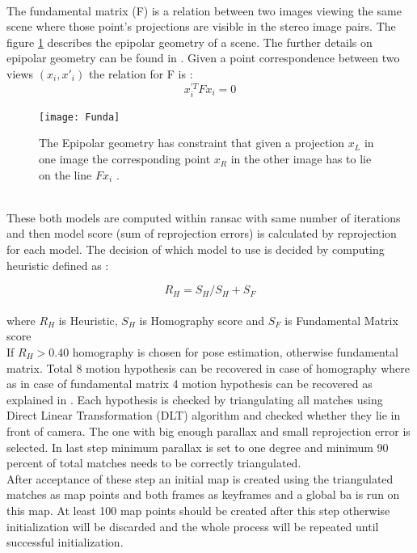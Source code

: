 \\
The fundamental matrix (F) is a relation between two images viewing the same scene where those point’s projections are visible in the stereo image pairs. The figure \ref{fig:F} describes the epipolar geometry of a scene. The further details on epipolar geometry can be found in \cite{multiview_geometry}. Given a point correspondence between two views 
$ (x_{i} , x{'}_{i}) $ the relation for F is : 
\begin{equation*}
x^{'T}_{i}Fx_{i} = 0    
\end{equation*}    
\newline
\begin{figure}[h]
	\centering
	\texttt{[image: Funda]}
	\caption{The Epipolar geometry has constraint that given a projection $ x_{L} $ in one image the corresponding point $ x_{R} $ in the other image has to lie on the line $ Fx_{i} $ \cite{multiview}.}
	\label{fig:F}
\end{figure}
\\
These both models are computed within \acrshort{ransac} with same number of iterations and then model score (sum of reprojection errors) is calculated by reprojection for each model.
The decision of which model to use is decided by computing heuristic defined as : 

\begin{equation*}
R_{H} = S_{H} / {S_{H} + S_{F}}  
\end{equation*}  
\\ 
where $ R_{H} $ is Heuristic, $ S_{H} $ is Homography score and $ S_{F} $ is Fundamental Matrix score \\
\linebreak
If $ R_{H}  > 0.40 $ homography is chosen for pose estimation, otherwise fundamental matrix. 
Total 8 motion hypothesis can be recovered in case of homography where as in case of fundamental matrix 4 motion hypothesis can be recovered as explained in \cite{multiview_geometry}. Each hypothesis is checked by triangulating all matches using Direct Linear Transformation (DLT) algorithm \cite{multiview_geometry} and checked whether they lie in front of camera. The one with big enough parallax and small reprojection error is selected. In last step minimum parallax is set to one degree and minimum 90 percent of total matches needs to be correctly triangulated. \\
\linebreak
After acceptance of these step an initial map is created using the triangulated matches as map points and both frames as keyframes and a global \acrshort{ba} is run on this map. At least 100 map points should be created after this step otherwise initialization will be discarded and the whole process will be repeated until successful initialization. 

